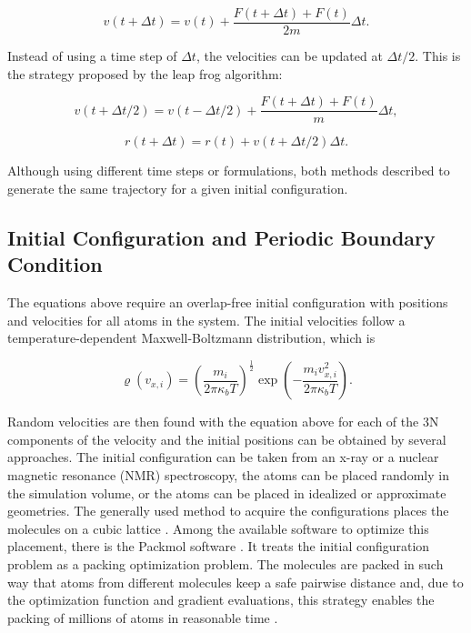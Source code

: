 \begin{equation}
v(t+ \Delta t) = v(t) +\frac{F(t+ \Delta t) +F(t)}{2m} \Delta t .
\end{equation}

Instead of using a time step of $\Delta t$, the velocities can be updated at $\Delta t /2$. This is the strategy proposed by the leap frog algorithm:

\begin{equation}
v(t+ \Delta t /2) = v(t- \Delta t /2) +\frac{F(t+ \Delta t) +F(t)}{m} \Delta t ,
\end{equation}

\begin{equation}
r(t+ \Delta t) = r(t) +v(t+ \Delta t /2) \Delta t .
\end{equation}

Although using different time steps or formulations, both methods described to generate the same trajectory for a given initial configuration.

\subsection{Initial Configuration and Periodic Boundary Condition} \label{icbc}

The equations above require an overlap-free initial configuration with positions and velocities for all atoms in the system. The initial velocities follow a temperature-dependent Maxwell-Boltzmann distribution, which is

\begin{equation}
\varrho (v_{x,i}) = \left (\frac{m_{i}}{2 \pi \kappa_{b} T} \right )^{\frac{1}{2}} \exp \left (-\frac{m_{i}v_{x,i}^2}{2 \pi \kappa_{b} T} \right) .
\end{equation}

Random velocities are then found with the equation above for each of the 3N components of the velocity and the initial positions can be obtained by several approaches. The initial configuration can be taken from an x-ray or a nuclear magnetic resonance (NMR) spectroscopy, the atoms can be placed randomly in the simulation volume, or the atoms can be placed in idealized or approximate geometries. The generally used method to acquire the configurations places the molecules on a cubic lattice \cite{shell2015}.  Among the available software to optimize this placement, there is the Packmol software \cite{packmol}. It treats the initial configuration problem as a packing optimization problem. The molecules are packed in such way that atoms from different molecules keep a safe pairwise distance and, due to the optimization function and gradient evaluations, this strategy enables the packing of millions of atoms in reasonable time \cite{packmol}.   

